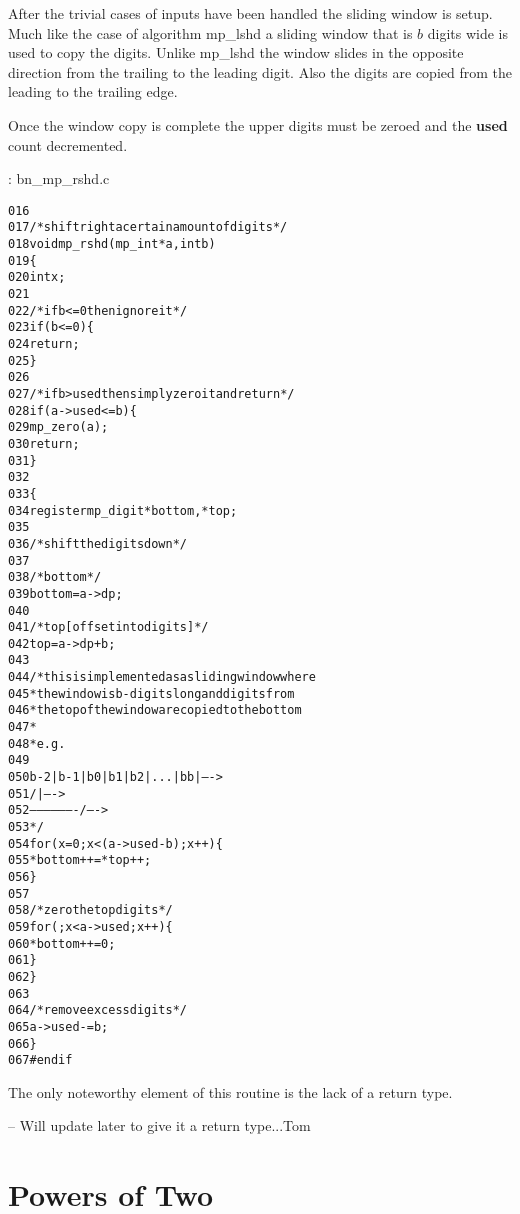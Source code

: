 \documentclass[b5paper]{book}
\begin{document}
After the trivial cases of inputs have been handled the sliding window is setup.  Much like the case of algorithm mp\_lshd a sliding window that
is $b$ digits wide is used to copy the digits.  Unlike mp\_lshd the window slides in the opposite direction from the trailing to the leading digit.  
Also the digits are copied from the leading to the trailing edge.

Once the window copy is complete the upper digits must be zeroed and the \textbf{used} count decremented.

\vspace{+3mm}\begin{small}
\hspace{-5.1mm}{\bf File}: bn\_mp\_rshd.c
\vspace{-3mm}
\begin{alltt}
016   
017   /* shift right a certain amount of digits */
018   void mp_rshd (mp_int * a, int b)
019   \{
020     int     x;
021   
022     /* if b <= 0 then ignore it */
023     if (b <= 0) \{
024       return;
025     \}
026   
027     /* if b > used then simply zero it and return */
028     if (a->used <= b) \{
029       mp_zero (a);
030       return;
031     \}
032   
033     \{
034       register mp_digit *bottom, *top;
035   
036       /* shift the digits down */
037   
038       /* bottom */
039       bottom = a->dp;
040   
041       /* top [offset into digits] */
042       top = a->dp + b;
043   
044       /* this is implemented as a sliding window where 
045        * the window is b-digits long and digits from 
046        * the top of the window are copied to the bottom
047        *
048        * e.g.
049   
050        b-2 | b-1 | b0 | b1 | b2 | ... | bb |   ---->
051                    /                   |      ---->
052                     -------------------/      ---->
053        */
054       for (x = 0; x < (a->used - b); x++) \{
055         *bottom++ = *top++;
056       \}
057   
058       /* zero the top digits */
059       for (; x < a->used; x++) \{
060         *bottom++ = 0;
061       \}
062     \}
063     
064     /* remove excess digits */
065     a->used -= b;
066   \}
067   #endif
\end{alltt}
\end{small}

The only noteworthy element of this routine is the lack of a return type.  

-- Will update later to give it a return type...Tom

\section{Powers of Two}
\end{document}
